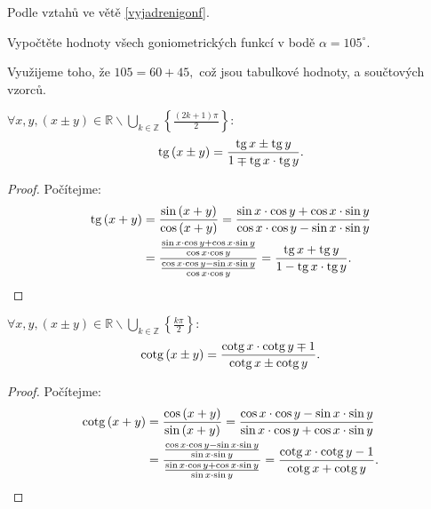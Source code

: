 \begin{reseni}
Podle vztahů ve větě \ref{vyjadrenigonf}.
\end{reseni}

\begin{priklad}
Vypočtěte hodnoty všech goniometrických funkcí v bodě $\alpha = 105^\circ$.
\end{priklad}

\begin{reseni}
Využijeme toho, že $105=60+45,$ což jsou tabulkové hodnoty, a součtových vzorců.
\end{reseni}

\begin{veta}
  $\forall x,y, (x\pm y)\in\mathbb{R}\smallsetminus\bigcup\limits_{k\in\mathbb{Z}} \left\{\frac{(2k+1)\pi}{2}\right\}:$
  $$\operatorname{tg}\left(x\pm y\right) = \frac{\operatorname{tg} x \pm \operatorname{tg} y}{1\mp\operatorname{tg} x \cdot \operatorname{tg} y}.$$
\end{veta}
\begin{proof}
    Počítejme:
    \begin{align*}
        \operatorname{tg} \left(x+y\right) & = \frac{\sin \left(x+y\right)}{\cos \left(x+y\right)}=\frac{\sin x\cdot  \cos y + \cos x\cdot  \sin y}{\cos x \cdot \cos y - \sin x\cdot  \sin y} \\
        & = \frac{\frac{\sin x \cdot \cos y + \cos x\cdot  \sin y}{\cos x \cdot \cos y}}{\frac{\cos x\cdot  \cos y - \sin x \cdot \sin y}{\cos x\cdot  \cos y}}=\frac{\operatorname{tg} x + \operatorname{tg} y}{1-\operatorname{tg} x \cdot \operatorname{tg} y}.\qedhere
    \end{align*}
\end{proof}


\begin{veta}
  $\forall x,y,(x\pm y)\in\mathbb{R}\smallsetminus\bigcup\limits_{k\in\mathbb{Z}} \left\{\frac{k\pi}{2}\right\}:$
  $$\operatorname{cotg}\left(x\pm y\right) = \frac{\operatorname{cotg} x \cdot \operatorname{cotg} y \mp 1}{\operatorname{cotg} x \pm \operatorname{cotg} y}.$$
\end{veta}

\begin{proof}
    Počítejme:
    \begin{align*}
        \operatorname{cotg} \left(x+y\right) & = \frac{\cos \left(x+y\right)}{\sin \left(x+y\right)}=\frac{\cos x \cdot \cos y - \sin x\cdot  \sin y}{\sin x\cdot  \cos y + \cos x\cdot  \sin y}\\
       &  = \frac{\frac{\cos x\cdot  \cos y - \sin x \cdot \sin y}{\sin x \cdot \sin y}}{\frac{\sin x \cdot \cos y + \cos x\cdot  \sin y}{\sin x\cdot  \sin y}}=\frac{\operatorname{cotg} x \cdot \operatorname{cotg} y-1}{\operatorname{cotg} x + \operatorname{cotg} y}.\qedhere
    \end{align*}
\end{proof}

